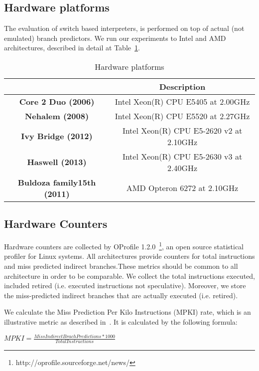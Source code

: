 \documentclass[parskip=full, paper=a4, fontsize=12pt]{scrartcl}
\numberwithin{equation}{section}
\numberwithin{figure}{section}
\numberwithin{table}{section}
\begin{document}
\subsection{Hardware platforms}
The evaluation of switch based interpreters, is performed on top of
actual (not emulated) branch predictors. We run our experiments to
Intel and AMD architectures, described in detail at Table~\ref{hw_p}.

\begin{table}[]
	\centering
	\caption{Hardware platforms}
	\label{hw_p}
	\begin{tabular}{|c|c|}
		\hline
		\textbf{}                           & \textbf{Description}                      \\ 
        \hline
		\textbf{Core 2 Duo (2006)}          & Intel Xeon(R) CPU E5405 at 2.00GHz        \\ 
        \hline
		\textbf{Nehalem (2008)}             & Intel Xeon(R) CPU E5520 at 2.27GHz        \\
        \hline
		\textbf{Ivy Bridge (2012)}          & Intel Xeon(R) CPU E5-2620 v2 at 2.10GHz   \\ 
        \hline
		\textbf{Haswell (2013)}             & Intel Xeon(R) CPU E5-2630 v3 at 2.40GHz   \\ 
        \hline
		\textbf{Buldoza family15th (2011)}  & AMD Opteron 6272 at 2.10GHz               \\ 
        \hline
	\end{tabular}
\end{table}

\subsection{Hardware Counters}
Hardware counters are collected by OProfile
1.2.0~\footnote{http://oprofile.sourceforge.net/news/}, an open source
statistical profiler for Linux systems. All architectures provide counters for
total instructions and miss predicted indirect branches.These metrics should be
common to all architecture in order to be comparable. We collect the total
instructions executed, included retired (i.e. executed instructions not
speculative). Moreover, we  store the miss-predicted indirect branches that are
actually executed (i.e. retired).

We calculate the Miss Prediction Per Kilo Instructions (MPKI) rate, which is an
illustrative metric as described in~\cite{performance_of_interpreters}. It is
calculated by the following formula:
\begin{center}
   $ MPKI = \frac{Miss Indirect Brach Predictions * 1000}{Total Instructions} $
\end{center}
\end{document}
